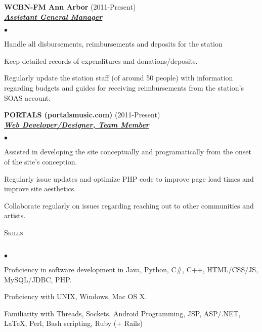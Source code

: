 \documentclass{article}
\newcommand{\lineunder}{\vspace*{-8pt} \\ \hspace*{-18pt} \hrulefill \\}
\newcommand{\header}[1]{{\hspace*{-15pt}\vspace*{6pt} \textsc{#1}} \vspace*{-6pt} \lineunder}
\newcommand{\employer}[3]{{ \textbf{#1} (#2)\\ \underline{\textbf{\emph{#3}}}\\  }}
\newenvironment{achievements}{\begin{list}{$\bullet$}{\topsep 0pt \itemsep -2pt}}{\vspace*{4pt}\end{list}}
\begin{document}
\employer{WCBN-FM Ann Arbor}{2011-Present} {Assistant General Manager}
	\begin{achievements}
	\item Handle all disbursements, reimbursements and deposits for the station
	\item Keep detailed records of expenditures and donations/deposits.
	\item Regularly update the station staff (of around 50 people) with information regarding budgets and guides for receiving reimbursements from the station's SOAS account.
	\end{achievements}

\employer{PORTALS (portalsmusic.com)}{2011-Present}{Web Developer/Designer, Team Member}
	\begin{achievements}
	\item Assisted in developing the site conceptually and programatically from the onset of the site's conception.
	\item Regularly issue updates and optimize PHP code to improve page load times and improve site aesthetics.
	\item Collaborate regularly on issues regarding reaching out to other communities and artists.
	\end{achievements}

\header{Skills}
\begin{achievements}
\item Proficiency in software development in Java, Python, C\#, C++, HTML/CSS/JS, MySQL/JDBC, PHP.
\item Proficiency with UNIX, Windows, Mac OS X.
\item Familiarity with Threads, Sockets, Android Programming, JSP, ASP/.NET, \LaTeX, Perl, Bash scripting, Ruby (+ Rails)
\end{achievements}
\end{document}
